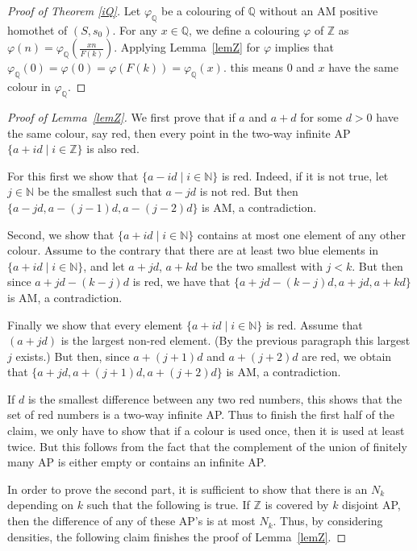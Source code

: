 \documentclass[12pt]{article}
\newcommand{\N}{{\mathbb N}}
\newcommand{\Z}{{\mathbb Z}}
\newcommand{\Q}{{\mathbb Q}}
\theoremstyle{plain}
\theoremstyle{definition}
\begin{document}
\begin{proof}[Proof of Theorem \ref{iQ}] Let $\varphi_\Q$ be a colouring of $\mathbb{Q}$ without an AM positive homothet of $(S,s_0)$. For any $x\in \mathbb{Q}$, we define a colouring $\varphi$ of $\Z$ as $\varphi(n)=\varphi_\Q(\frac{xn}{F(k)})$. Applying Lemma~\ref{lemZ} for $\varphi$ implies that $\varphi_\Q(0)=\varphi(0)=\varphi(F(k))=\varphi_\Q(x)$. this means $0$ and $x$ have
the same colour in $\varphi_\Q$. 
\end{proof}

\begin{proof}[Proof of Lemma~\ref{lemZ}] 
We first prove that if $a$ and $a+d$ for some $d>0$ have the same colour, say red, then every point in the two-way infinite AP $\{a+id\mid i\in \Z\}$ is also red. 
    
For this first we show that $\{a-id\mid i\in \N\}$ is red. Indeed, if it is not true, let $j\in \mathbb{N}$ be the smallest such that $a-jd$ is not red. But then $\{a-jd,a-(j-1)d,a-(j-2)d\}$ is AM, a contradiction. 
    
Second, we show that $\{a+id\mid i\in \N\}$ contains at most one element of any other colour. Assume to the contrary that there are at least two blue elements in $\{a+id\mid i\in \N\}$, and let $a+jd$, $a+kd$ be the two smallest with $j<k$. But then since $a+jd-(k-j)d$ is red, we have that $\{a+jd-(k-j)d, a+jd, a+kd\}$ is AM, a contradiction. 
    
Finally we show that every element $\{a+id\mid i\in \N\}$ is red. Assume that $(a+jd)$ is the largest non-red element. (By the previous paragraph this largest $j$ exists.) But then, since $a+(j+1)d$ and $a+(j+2)d$ are red, we obtain that $\{a+jd,a+(j+1)d, a+(j+2)d\}$ is AM, a contradiction.

If $d$ is the smallest difference between any two red numbers, this shows that the set of red numbers is a two-way infinite AP. Thus to finish the first half of the claim, we only have to show that if a colour is used once, then it is used at least twice. But this follows from the fact that the complement of the union of finitely many AP is either empty or contains an infinite AP.


In order to prove the second part, it is sufficient to show that there is an $N_k$ depending on $k$ such that the following is true. If $\mathbb{Z}$ is covered by $k$ disjoint AP, then the difference of any of these AP's is at most $N_k$. Thus, by considering densities, the following claim finishes the proof of Lemma~\ref{lemZ}.
    

\end{proof}
\end{document}
